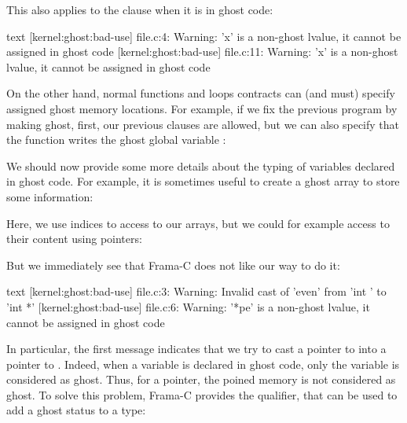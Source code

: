 This also applies to the  clause when it is
in ghost code:




\begin{CodeBlock}{text}
[kernel:ghost:bad-use] file.c:4: Warning:
  'x' is a non-ghost lvalue, it cannot be assigned in ghost code
[kernel:ghost:bad-use] file.c:11: Warning:
  'x' is a non-ghost lvalue, it cannot be assigned in ghost code
\end{CodeBlock}


On the other hand, normal functions and loops contracts can (and
must) specify assigned ghost memory locations. For example, if we
fix the previous program by making  ghost, first, our
previous  clauses are allowed, but we can also
specify that the function  writes the ghost global
variable :






We should now provide some more details about the typing of variables
declared in ghost code. For example, it is sometimes useful to create
a ghost array to store some information:




Here, we use indices to access to our arrays, but we could for example
access to their content using pointers:




But we immediately see that Frama-C does not like our way to do it:


\begin{CodeBlock}{text}
[kernel:ghost:bad-use] file.c:3: Warning:
  Invalid cast of 'even' from 'int \ghost *' to 'int *'
[kernel:ghost:bad-use] file.c:6: Warning:
  '*pe' is a non-ghost lvalue, it cannot be assigned in ghost code
\end{CodeBlock}


In particular, the first message indicates that we try to cast
a pointer to  into a pointer
to . Indeed, when a variable is declared in ghost
code, only the variable is considered as ghost. Thus, for a pointer,
the poined memory is not considered as ghost. To solve this problem,
Frama-C provides the  qualifier,
that can be used to add a ghost status to a type:


